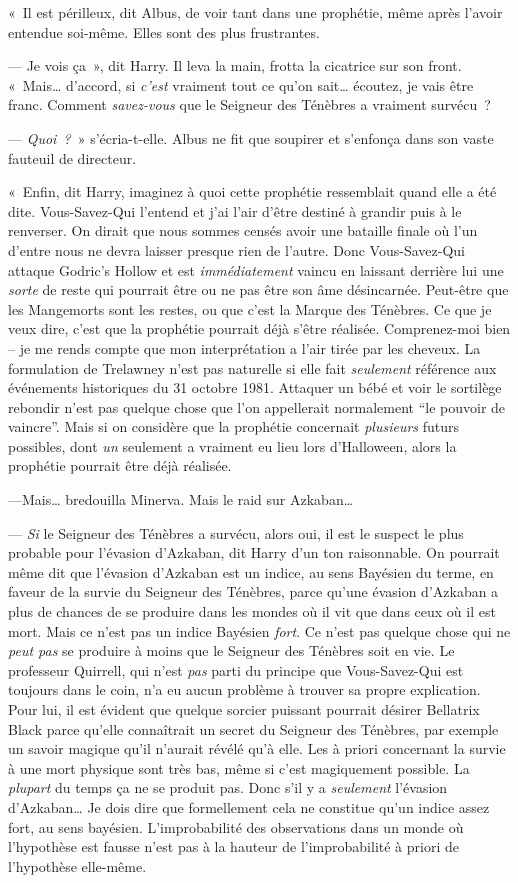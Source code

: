 «~Il est périlleux, dit Albus, de voir tant dans une prophétie, même après l'avoir entendue soi-même.
Elles sont des plus frustrantes.

--- Je vois ça~», dit Harry.
Il leva la main, frotta la cicatrice sur son front.
«~Mais… d'accord, si \emph{c'est} vraiment tout ce qu'on sait… écoutez, je vais être franc.
Comment \emph{savez-vous} que le Seigneur des Ténèbres a vraiment survécu~?

--- \emph{Quoi~?}~» s'écria-t-elle.
Albus ne fit que soupirer et s'enfonça dans son vaste fauteuil de directeur.

«~Enfin, dit Harry, imaginez à quoi cette prophétie ressemblait quand elle a été dite.
Vous-Savez-Qui l'entend et j'ai l'air d'être destiné à grandir puis à le renverser.
On dirait que nous sommes censés avoir une bataille finale où l'un d'entre nous ne devra laisser presque rien de l'autre.
Donc Vous-Savez-Qui attaque Godric's Hollow et est \emph{immédiatement} vaincu en laissant derrière lui une \emph{sorte} de reste qui pourrait être ou ne pas être son âme désincarnée.
Peut-être que les Mangemorts sont les restes, ou que c'est la Marque des Ténèbres.
Ce que je veux dire, c'est que la prophétie pourrait déjà s'être réalisée.
Comprenez-moi bien -- je me rends compte que mon interprétation a l'air tirée par les cheveux.
La formulation de Trelawney n'est pas naturelle si elle fait \emph{seulement} référence aux événements historiques du 31 octobre 1981.
Attaquer un bébé et voir le sortilège rebondir n'est pas quelque chose que l'on appellerait normalement “le pouvoir de vaincre”.
Mais si on considère que la prophétie concernait \emph{plusieurs} futurs possibles, dont \emph{un} seulement a vraiment eu lieu lors d'Halloween, alors la prophétie pourrait être déjà réalisée.

---Mais… bredouilla Minerva.
Mais le raid sur Azkaban…

--- \emph{Si} le Seigneur des Ténèbres a survécu, alors oui, il est le suspect le plus probable pour l'évasion d'Azkaban, dit Harry d'un ton raisonnable.
On pourrait même dit que l'évasion d'Azkaban est un indice, au sens Bayésien du terme, en faveur de la survie du Seigneur des Ténèbres, parce qu'une évasion d'Azkaban a plus de chances de se produire dans les mondes où il vit que dans ceux où il est mort.
Mais ce n'est pas un indice Bayésien \emph{fort}.
Ce n'est pas quelque chose qui ne \emph{peut pas} se produire à moins que le Seigneur des Ténèbres soit en vie.
Le professeur Quirrell, qui n'est \emph{pas} parti du principe que Vous-Savez-Qui est toujours dans le coin, n'a eu aucun problème à trouver sa propre explication.
Pour lui, il est évident que quelque sorcier puissant pourrait désirer Bellatrix Black parce qu'elle connaîtrait un secret du Seigneur des Ténèbres, par exemple un savoir magique qu'il n'aurait révélé qu'à elle.
Les à priori concernant la survie à une mort physique sont très bas, même si c'est magiquement possible.
La \emph{plupart} du temps ça ne se produit pas.
Donc s'il y a \emph{seulement} l'évasion d'Azkaban…
Je dois dire que formellement cela ne constitue qu'un indice assez fort, au sens bayésien.
L'improbabilité des observations dans un monde où l'hypothèse est fausse n'est pas à la hauteur de l'improbabilité à priori de l'hypothèse elle-même.

